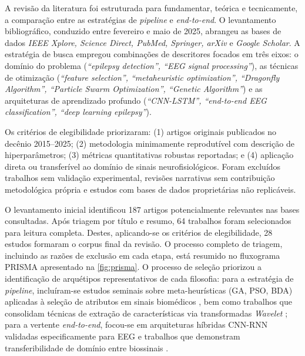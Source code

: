 \documentclass[alpha-refs,brazilian]{CC-EC_TF-TC}
\begin{document}
A revisão da literatura foi estruturada para fundamentar, teórica e tecnicamente, a comparação entre as estratégias de \textit{pipeline} e \textit{end-to-end}. O levantamento bibliográfico, conduzido entre fevereiro e maio de 2025, abrangeu as bases de dados \textit{IEEE Xplore, Science Direct, PubMed, Springer, arXiv} e \textit{Google Scholar}. A estratégia de busca empregou combinações de descritores focados em três eixos: o domínio do problema (\textit{``epilepsy detection'', ``EEG signal processing''}), as técnicas de otimização (\textit{``feature selection'', ``metaheuristic optimization'', ``Dragonfly Algorithm'', ``Particle Swarm Optimization'', ``Genetic Algorithm''}) e as arquiteturas de aprendizado profundo (\textit{``CNN-LSTM'', ``end-to-end EEG classification'', ``deep learning epilepsy''}).

Os critérios de elegibilidade priorizaram: (1) artigos originais publicados no decênio 2015–2025; (2) metodologia minimamente reprodutível com descrição de hiperparâmetros; (3) métricas quantitativas robustas reportadas; e (4) aplicação direta ou transferível ao domínio de sinais neurofisiológicos. Foram excluídos trabalhos sem validação experimental, revisões narrativas sem contribuição metodológica própria e estudos com bases de dados proprietárias não replicáveis.

O levantamento inicial identificou 187 artigos potencialmente relevantes nas bases consultadas. Após triagem por título e resumo, 64 trabalhos foram selecionados para leitura completa. Destes, aplicando-se os critérios de elegibilidade, 28 estudos formaram o corpus final da revisão. O processo completo de triagem, incluindo as razões de exclusão em cada etapa, está resumido no fluxograma PRISMA apresentado na \autoref{fig:prisma}. O processo de seleção priorizou a identificação de arquétipos representativos de cada filosofia: para a estratégia de \textit{pipeline}, incluíram-se estudos seminais sobre meta-heurísticas (GA, PSO, BDA) aplicadas à seleção de atributos em sinais biomédicos \citep{Subasi2007, Kennedy1997, Adam2014, Mirjalili2016, Emary2016, Mafarja2017}, bem como trabalhos que consolidam técnicas de extração de características via transformadas \textit{Wavelet} \citep{Adeli2003, Subasi2010}; para a vertente \textit{end-to-end}, focou-se em arquiteturas híbridas CNN-RNN validadas especificamente para EEG \citep{Roy2019Deep, Lu2019Residual, Khan2023, Wang2024} e trabalhos que demonstram transferibilidade de domínio entre biossinais \citep{Maggioni2023, Maggioni2024}.
\end{document}
